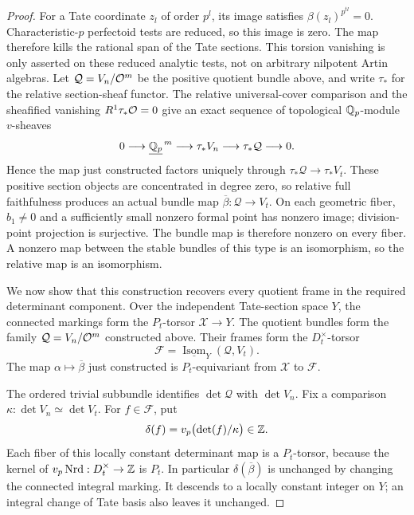 \begin{proof}
For a Tate coordinate $z_l$ of order $p^l$, its image satisfies
$\beta(z_l)^{p^{tl}}=0$.  Characteristic-$p$ perfectoid tests are reduced,
so this image is zero.  The map therefore kills the rational span of
the Tate sections.  This torsion vanishing is only asserted on these
reduced analytic tests, not on arbitrary nilpotent Artin algebras.
Let $\mathcal Q=V_n/\mathcal O^m$ be the positive quotient bundle above, and
write $\tau_*$ for the relative section-sheaf functor.  The relative
universal-cover comparison and the sheafified vanishing
$R^1\tau_*\mathcal O=0$ give an exact sequence of topological
$\mathbb Q_p$-module $v$-sheaves
\[
 0\longrightarrow\underline{\mathbb Q_p}^{\,m}\longrightarrow\tau_*V_n
 \longrightarrow\tau_*\mathcal Q\longrightarrow0.
\]
Hence the map just constructed factors uniquely through
$\tau_*\mathcal Q\to\tau_*V_t$.  These positive section objects are
concentrated in degree zero, so relative full faithfulness produces an
actual bundle map $\overline\beta:\mathcal Q\to V_t$.  On each geometric fiber,
$b_1\ne0$ and a sufficiently small nonzero formal point has nonzero
image; division-point projection is surjective.  The bundle map is
therefore nonzero on every fiber.  A nonzero map between the stable
bundles of this type is an isomorphism, so the relative map is an
isomorphism.

We now show that this construction recovers every quotient frame
in the required determinant component.  Over the independent
Tate-section space $Y$, the connected markings form the $P_t$-torsor
$\mathcal X\to Y$.  The quotient bundles form the family
$\mathcal Q=V_n/\mathcal O^m$ constructed above.  Their frames form the
$D_t^\times$-torsor
\[
 \mathscr F=\underline{\operatorname{Isom}}_Y(\mathcal Q,V_t).
\]
The map $\alpha\mapsto\overline\beta$ just constructed is
$P_t$-equivariant from $\mathcal X$ to $\mathscr F$.

The ordered trivial subbundle identifies $\det\mathcal Q$ with
$\det V_n$.  Fix a comparison $\kappa:\det V_n\simeq\det V_t$.
For $f\in\mathscr F$, put
\[
 \delta(f)=v_p\bigl(\det(f)/\kappa\bigr)\in\mathbb Z.
\]
Each fiber of this locally constant determinant map is a
$P_t$-torsor, because the kernel of
$v_p\operatorname{Nrd}:D_t^\times\to\mathbb Z$ is $P_t$.
In particular $\delta(\overline\beta)$ is unchanged by changing
the connected integral marking.  It descends to a locally constant
integer on $Y$; an integral change of Tate basis also leaves it
unchanged.


\end{proof}
